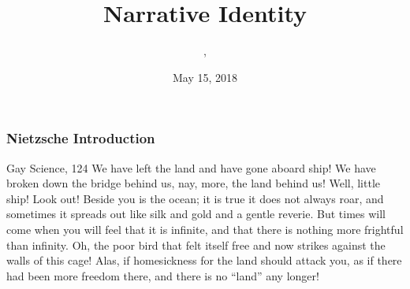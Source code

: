 \documentclass[xcolor=dvipsnames]{beamer}
\title{Narrative Identity}
\subtitle{{\CourseNumber}, {\CourseInst}}
\author{\CourseName}
\date{May 15, 2018}
\begin{document}
\begin{frame}
  \titlepage
\end{frame}

\begin{frame}
  \frametitle{Nietzsche Introduction}
  \begin{block}{Gay Science, 124}
    We have left the land and have gone aboard ship! We have broken
    down the bridge behind us, nay, more, the land behind us! Well,
    little ship! Look out! Beside you is the ocean; it is true it
    does not always roar, and sometimes it spreads out like silk and
    gold and a gentle reverie. But times will come when you will feel
    that it is infinite, and that there is nothing more frightful than
    infinity. Oh, the poor bird that felt itself free and now strikes
    against the walls of this cage! Alas, if homesickness for the
    land should attack you, as if there had been more freedom there,
    and there is no ``land'' any longer!
  \end{block}
\end{frame}

\end{document}
